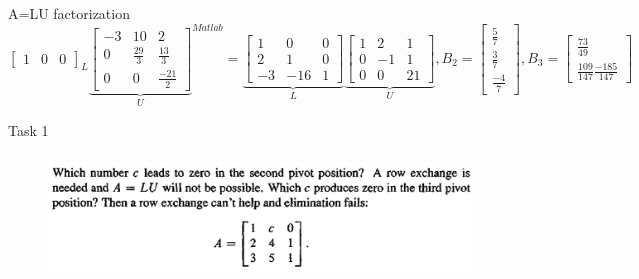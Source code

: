 \documentclass[aspectratio=169]{beamer}
\begin{document}
\begin{frame}[t]{A=LU factorization}
{{\begin{equation*}
{{\begin{bmatrix}
        1 & 0  & 0 
        \end{bmatrix}}_{L}\underbrace{\begin{bmatrix}
        -3 & 10 & 2 \\
        0 & \frac{29}{3} & \frac{13}{3} \\ 
        0 & 0  & \frac{-21}{2} 
        \end{bmatrix}}_{U}}^{Matlab}=\underbrace{\begin{bmatrix}
        1 & 0 & 0 \\
        2 & 1 & 0 \\ 
        -3 & -16  & 1 
        \end{bmatrix}}_{L}\underbrace{\begin{bmatrix}
        1 & 2 & 1 \\
        0 & -1 & 1 \\ 
        0 & 0  & 21 
        \end{bmatrix}}_{U},B_2=\begin{bmatrix}
            \frac{5}{7}\\ \frac{3}{7} \\ \frac{-4}{7}
        \end{bmatrix},B_3=\begin{bmatrix}
            \frac{73}{49}\\ \frac{109}{147} \frac{-185}{147}
        \end{bmatrix}
    \end{equation*}}}
    \end{frame}

    \begin{frame}[t]{Task 1}
    \framesubtitle{}
    \begin{figure}[H]
        \centering\includegraphics[height=3cm,width=1\textwidth,keepaspectratio]{1.png}
        \label{fig:1.png}
    \end{figure}
    \end{frame}
\end{document}
